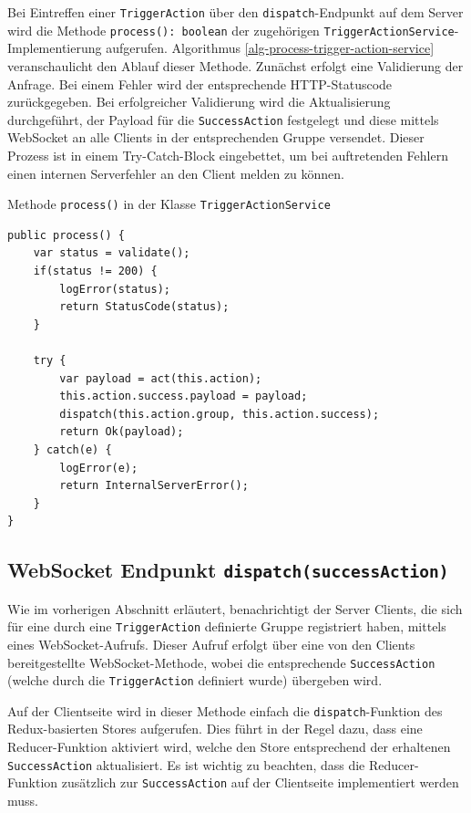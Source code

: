 \documentclass[12pt]{book}          %
\begin{document}
Bei Eintreffen einer \texttt{TriggerAction} über den \texttt{dispatch}-Endpunkt auf dem Server wird die Methode \texttt{process(): boolean} der zugehörigen \texttt{TriggerActionService}-Implementierung aufgerufen. Algorithmus \ref{alg-process-trigger-action-service} veranschaulicht den Ablauf dieser Methode. Zunächst erfolgt eine Validierung der Anfrage. Bei einem Fehler wird der entsprechende HTTP-Statuscode zurückgegeben. Bei erfolgreicher Validierung wird die Aktualisierung durchgeführt, der Payload für die \texttt{SuccessAction} festgelegt und diese mittels WebSocket an alle Clients in der entsprechenden Gruppe versendet. Dieser Prozess ist in einem Try-Catch-Block eingebettet, um bei auftretenden Fehlern einen internen Serverfehler an den Client melden zu können.

\begin{algorithm}
\caption{Methode \texttt{process()} in der Klasse \texttt{TriggerActionService}}
\label{alg-process-trigger-action-service}
\begin{lstlisting}
public process() {
    var status = validate();
    if(status != 200) {
        logError(status);
        return StatusCode(status);
    }
    
    try {
        var payload = act(this.action);
        this.action.success.payload = payload;
        dispatch(this.action.group, this.action.success);
        return Ok(payload);
    } catch(e) {
        logError(e);
        return InternalServerError();
    }
}
\end{lstlisting}
\end{algorithm}

\subsection{WebSocket Endpunkt \texttt{dispatch(successAction)}}
\label{subsec-web-socket-endpunkt-disptach-success-action}

Wie im vorherigen Abschnitt erläutert, benachrichtigt der Server Clients, die sich für eine durch eine \texttt{TriggerAction} definierte Gruppe registriert haben, mittels eines WebSocket-Aufrufs. Dieser Aufruf erfolgt über eine von den Clients bereitgestellte WebSocket-Methode, wobei die entsprechende \texttt{SuccessAction} (welche durch die \texttt{TriggerAction} definiert wurde) übergeben wird. 

Auf der Clientseite wird in dieser Methode einfach die \texttt{dispatch}-Funktion des Redux-basierten Stores aufgerufen. Dies führt in der Regel dazu, dass eine Reducer-Funktion aktiviert wird, welche den Store entsprechend der erhaltenen \texttt{SuccessAction} aktualisiert. Es ist wichtig zu beachten, dass die Reducer-Funktion zusätzlich zur \texttt{SuccessAction} auf der Clientseite implementiert werden muss.
\end{document}

